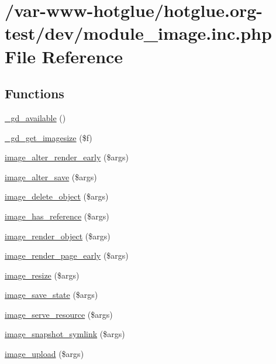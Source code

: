 \hypertarget{module__image_8inc_8php}{
\section{/var-\/www-\/hotglue/hotglue.org-\/test/dev/module\_\-image.inc.php File Reference}
\label{module__image_8inc_8php}
}
\subsection*{Functions}
\begin{DoxyCompactItemize}
\item 
\hyperlink{module__image_8inc_8php_a574d6d760e50b88ffa815cab30a5e634}{\_\-gd\_\-available} ()
\item 
\hyperlink{module__image_8inc_8php_a3c76028c34273e722c9691243377a208}{\_\-gd\_\-get\_\-imagesize} (\$f)
\item 
\hyperlink{module__image_8inc_8php_ab52d6b71a5c26dbb7e86653652a23251}{image\_\-alter\_\-render\_\-early} (\$args)
\item 
\hyperlink{module__image_8inc_8php_a93578776fb38b10d47bc711cc3469ae9}{image\_\-alter\_\-save} (\$args)
\item 
\hyperlink{module__image_8inc_8php_a7cbcf6138ccff16a8b733cfd6f0f1666}{image\_\-delete\_\-object} (\$args)
\item 
\hyperlink{module__image_8inc_8php_a0bef6164f5eafe368d251639cf6fe298}{image\_\-has\_\-reference} (\$args)
\item 
\hyperlink{module__image_8inc_8php_a4fadded2a225d1b5ea73404a84597620}{image\_\-render\_\-object} (\$args)
\item 
\hyperlink{module__image_8inc_8php_a8266a74a11a86a73e2aa3709388fd43f}{image\_\-render\_\-page\_\-early} (\$args)
\item 
\hyperlink{module__image_8inc_8php_a9e03a71310133176236ae0bd4a0241e0}{image\_\-resize} (\$args)
\item 
\hyperlink{module__image_8inc_8php_ac26ea1448f0b7ed835907cf7c22b60ca}{image\_\-save\_\-state} (\$args)
\item 
\hyperlink{module__image_8inc_8php_abb6646bfaa6a012e620cdaaa0bc3c807}{image\_\-serve\_\-resource} (\$args)
\item 
\hyperlink{module__image_8inc_8php_a65d33fafe2da58d0f87f2df1fedbbe62}{image\_\-snapshot\_\-symlink} (\$args)
\item 
\hyperlink{module__image_8inc_8php_a37dee9de60e2852c0631d8e60e58585c}{image\_\-upload} (\$args)
\end{DoxyCompactItemize}


